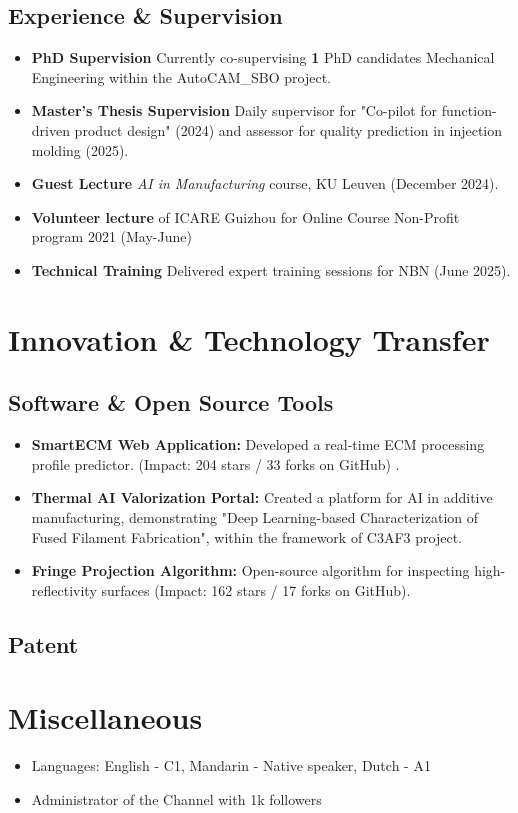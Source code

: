 \documentclass{resume}
\begin{document}
\subsection{Experience \& Supervision}
\begin{itemize}[parsep=0.5ex]
  \item \textbf{PhD Supervision} Currently co-supervising \textbf{1} PhD candidates Mechanical Engineering within the AutoCAM\_SBO project.
  \item \textbf{Master's Thesis Supervision} Daily supervisor for "Co-pilot for function-driven product design" (2024) and assessor for quality prediction in injection molding (2025).
  \item \textbf{Guest Lecture} \textit{AI in Manufacturing} course, KU Leuven (December 2024).
  \item \textbf{Volunteer lecture} of ICARE Guizhou for Online Course Non-Profit program 2021 (May-June)
  \item \textbf{Technical Training} Delivered expert training sessions for NBN (June 2025).
\end{itemize}

\section{Innovation \& Technology Transfer}
\subsection{Software \& Open Source Tools}
\begin{itemize}
  \item \textbf{SmartECM Web Application:} Developed a real-time ECM processing profile predictor. (Impact: 204 stars / 33 forks on GitHub) .
  \item \textbf{Thermal AI Valorization Portal:} Created a platform for AI in additive manufacturing, demonstrating "Deep Learning-based Characterization of Fused Filament Fabrication", within the framework of C3AF3 project.
  \item \textbf{Fringe Projection Algorithm:} Open-source algorithm for inspecting high-reflectivity surfaces (Impact: 162 stars / 17 forks on GitHub).
\end{itemize}

\subsection{Patent}
\begin{enumerate}
  
\end{enumerate}

\vspace{5mm}
\section{Miscellaneous}
\begin{itemize}[parsep=0.5ex]
  \item Languages: English - C1, Mandarin - Native speaker, Dutch - A1
  \item Administrator of the Channel with \SLASH1k followers
\end{itemize}
\end{document}

